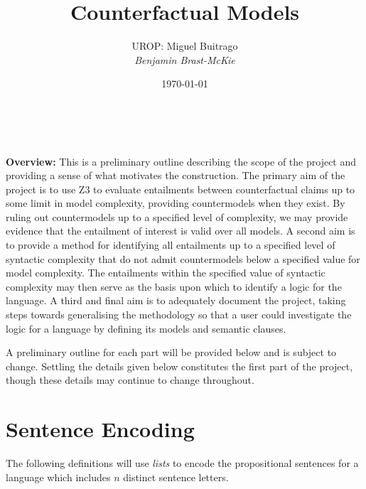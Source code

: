 \documentclass[a4paper, 11pt]{article} %
\title{\textbf{Counterfactual Models}} %
\author{\textsc{UROP:} Miguel Buitrago\\ \em Benjamin Brast-McKie} %
\date{\today} %
\makeatletter
\renewcommand{\L}[0]{\mathcal{L}}
\renewcommand{\maketitle}{ %
\begin{flushright} %
{\LARGE\@title} %

\vspace{10pt} %

{\@author} %
\\\@date %

\vspace{10pt} %
\end{flushright}
}
\makeatother
\begin{document}
\maketitle %

\thispagestyle{empty}



\noindent
\textbf{Overview:} 
This is a preliminary outline describing the scope of the project and providing a sense of what motivates the construction.
The primary aim of the project is to use Z3 to evaluate entailments between counterfactual claims up to some limit in model complexity, providing countermodels when they exist.
By ruling out countermodels up to a specified level of complexity, we may provide evidence that the entailment of interest is valid over all models.
A second aim is to provide a method for identifying all entailments up to a specified level of syntactic complexity that do not admit countermodels below a specified value for model complexity.
The entailments within the specified value of syntactic complexity may then serve as the basis upon which to identify a logic for the language.
A third and final aim is to adequately document the project, taking steps towards generalising the methodology so that a user could investigate the logic for a language by defining its models and semantic clauses. 

A preliminary outline for each part will be provided below and is subject to change.
Settling the details given below constitutes the first part of the project, though these details may continue to change throughout.






\section{Sentence Encoding}

The following definitions will use \textit{lists} to encode the propositional sentences for a language which includes $n$ distinct sentence letters.
\end{document}
